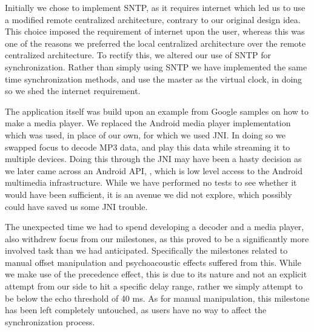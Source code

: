 Initially we chose to implement \ac{SNTP}, as it requires internet which led us to use a modified remote centralized architecture, contrary to our original design idea.
This choice imposed the requirement of internet upon the user, whereas this was one of the reasons we preferred the local centralized architecture over the remote centralized architecture.
To rectify this, we altered our use of \ac{SNTP} for synchronization.
Rather than simply using \ac{SNTP} we have implemented the same time synchronization methods, and use the master as the virtual clock, in doing so we shed the internet requirement.

\bigskip
The application itself was build upon an example from Google samples on how to make a media player.
We replaced the Android media player implementation which was used, in place of our own, for which we used \ac{JNI}.
In doing so we swapped focus to decode MP3 data, and play this data while streaming it to multiple devices.
Doing this through the \ac{JNI} may have been a hasty decision as we later came across an Android API, , which is low level access to the Android multimedia infrastructure.
While we have performed no tests to see whether it would have been sufficient, it is an avenue we did not explore, which possibly could have saved us some \ac{JNI} trouble.

The unexpected time we had to spend developing a decoder and a media player, also withdrew focus from our milestones, as this proved to be a significantly more involved task than we had anticipated.
Specifically the milestones related to manual offset manipulation and psychoacoustic effects suffered from this.
While we make use of the precedence effect, this is due to its nature and not an explicit attempt from our side to hit a specific delay range, rather we simply attempt to be below the echo threshold of 40 ms.
As for manual manipulation, this milestone has been left completely untouched, as users have no way to affect the synchronization process.


